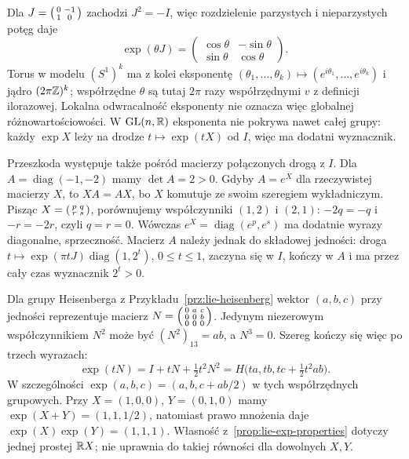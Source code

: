 \begin{przyklad}
Dla $J=\begin{psmallmatrix}0&-1\\1&0\end{psmallmatrix}$
zachodzi $J^2=-I$, więc rozdzielenie parzystych i
nieparzystych potęg daje
\[
 \exp(\theta J)=
 \begin{pmatrix}\cos\theta&-\sin\theta\\
 \sin\theta&\cos\theta\end{pmatrix}.
\]
Torus w modelu $(S^1)^k$ ma z kolei eksponentę
$(\theta_1,\ldots,\theta_k)\mapsto
(e^{i\theta_1},\ldots,e^{i\theta_k})$ i jądro
$(2\pi\mathbb{Z})^k$; współrzędne $\theta$ są tutaj
$2\pi$ razy współrzędnymi $v$ z definicji ilorazowej.
Lokalna odwracalność eksponenty nie oznacza więc
globalnej różnowartościowości. W $\mathrm{GL}(n,\mathbb{R})$
eksponenta nie pokrywa nawet całej grupy: każdy
$\exp X$ leży na drodze $t\mapsto\exp(tX)$ od $I$,
więc ma dodatni wyznacznik.

Przeszkoda występuje także pośród macierzy połączonych drogą
z $I$. Dla $A=\operatorname{diag}(-1,-2)$ mamy $\det A=2>0$.
Gdyby $A=e^X$ dla rzeczywistej macierzy $X$, to $XA=AX$,
bo $X$ komutuje ze swoim szeregiem wykładniczym.
Pisząc $X=\begin{psmallmatrix}p&q\\r&s\end{psmallmatrix}$,
porównujemy współczynniki $(1,2)$ i $(2,1)$:
$-2q=-q$ i $-r=-2r$, czyli $q=r=0$.
Wówczas $e^X=\operatorname{diag}(e^p,e^s)$ ma dodatnie
wyrazy diagonalne, sprzeczność.
Macierz $A$ należy jednak do składowej jedności:
droga $t\mapsto\exp(\pi tJ)\operatorname{diag}(1,2^t)$,
$0\leq t\leq1$, zaczyna się w $I$, kończy w $A$
i ma przez cały czas wyznacznik $2^t>0$.

Dla grupy Heisenberga z Przykładu~\ref{prz:lie-heisenberg}
wektor $(a,b,c)$ przy jedności reprezentuje macierz
$N=\begin{psmallmatrix}0&a&c\\0&0&b\\0&0&0\end{psmallmatrix}$.
Jedynym niezerowym współczynnikiem $N^2$ może być
$(N^2)_{13}=ab$, a $N^3=0$. Szereg kończy się więc po trzech wyrazach:
\[
 \exp(tN)=I+tN+\tfrac12t^2N^2
 =H\bigl(ta,tb,tc+\tfrac12t^2ab\bigr).
\]
W szczególności $\exp(a,b,c)=(a,b,c+ab/2)$ w tych
współrzędnych grupowych. Przy $X=(1,0,0)$, $Y=(0,1,0)$
mamy $\exp(X+Y)=(1,1,1/2)$, natomiast prawo mnożenia daje
$\exp(X)\exp(Y)=(1,1,1)$.
Własność z~\ref{prop:lie-exp-properties} dotyczy jednej
prostej $\mathbb{R} X$; nie uprawnia do takiej równości dla dowolnych $X,Y$.
\end{przyklad}

